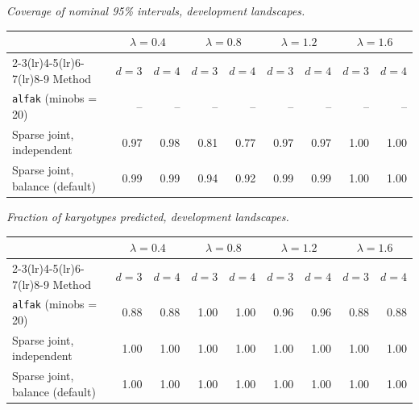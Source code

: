 \par\medskip\noindent\begin{minipage}{\linewidth}
\textit{Coverage of nominal 95\% intervals, development landscapes.}
\begin{center}
\footnotesize
\setlength{\tabcolsep}{3.5pt}
\begin{tabular}{l*{8}{r}}
\toprule
 & \multicolumn{2}{c}{$\lambda=0.4$} & \multicolumn{2}{c}{$\lambda=0.8$} & \multicolumn{2}{c}{$\lambda=1.2$} & \multicolumn{2}{c}{$\lambda=1.6$} \\
\cmidrule(lr){2-3}\cmidrule(lr){4-5}\cmidrule(lr){6-7}\cmidrule(lr){8-9}
Method & $d=3$ & $d=4$ & $d=3$ & $d=4$ & $d=3$ & $d=4$ & $d=3$ & $d=4$ \\
\midrule
\texttt{alfak} (minobs = 20) & -- & -- & -- & -- & -- & -- & -- & -- \\
Sparse joint, independent & 0.97 & 0.98 & 0.81 & 0.77 & 0.97 & 0.97 & 1.00 & 1.00 \\
Sparse joint, balance (default) & 0.99 & 0.99 & 0.94 & 0.92 & 0.99 & 0.99 & 1.00 & 1.00 \\
\bottomrule
\end{tabular}
\end{center}
\end{minipage}

\par\medskip\noindent\begin{minipage}{\linewidth}
\textit{Fraction of karyotypes predicted, development landscapes.}
\begin{center}
\footnotesize
\setlength{\tabcolsep}{3.5pt}
\begin{tabular}{l*{8}{r}}
\toprule
 & \multicolumn{2}{c}{$\lambda=0.4$} & \multicolumn{2}{c}{$\lambda=0.8$} & \multicolumn{2}{c}{$\lambda=1.2$} & \multicolumn{2}{c}{$\lambda=1.6$} \\
\cmidrule(lr){2-3}\cmidrule(lr){4-5}\cmidrule(lr){6-7}\cmidrule(lr){8-9}
Method & $d=3$ & $d=4$ & $d=3$ & $d=4$ & $d=3$ & $d=4$ & $d=3$ & $d=4$ \\
\midrule
\texttt{alfak} (minobs = 20) & 0.88 & 0.88 & 1.00 & 1.00 & 0.96 & 0.96 & 0.88 & 0.88 \\
Sparse joint, independent & 1.00 & 1.00 & 1.00 & 1.00 & 1.00 & 1.00 & 1.00 & 1.00 \\
Sparse joint, balance (default) & 1.00 & 1.00 & 1.00 & 1.00 & 1.00 & 1.00 & 1.00 & 1.00 \\
\bottomrule
\end{tabular}
\end{center}
\end{minipage}

